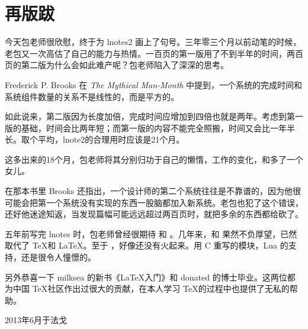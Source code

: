 \chapter{再版跋}

今天包老师很欣慰，终于为 lnotes2 画上了句号。三年零三个月以前动笔的时候，老包又一次高估了自己的能力与热情。一百页的第一版用了不到半年的时间，两百页的第二版为什么会如此难产呢？包老师陷入了深深的思考。

Frederick P. Brooks 在 \emph{The Mythical Man-Month} 中提到，一个系统的完成时间和系统组件数量的关系不是线性的，而是平方的。

如此说来，第二版因为长度加倍，完成时间应增加到四倍也就是两年。考虑到第一版的基础，时间会比两年短；而第一版的内容不能完全照搬，时间又会比一年半长。取个平均，lnote2的合理用时应该是21个月。

这多出来的18个月，包老师将其分别归功于自己的懒惰，工作的变化，和多了一个女儿。

在那本书里 Brooks 还指出，一个设计师的第二个系统往往是不靠谱的，因为他很可能会把第一个系统没有实现的东西一股脑都加入新系统。老包也犯了这个错误，还好他迷途知返，当发现篇幅可能远远超过两百页时，就把多余的东西都给砍了。

五年前写完 lnotes 时，包老师曾经很期待 \XeTeX 和 \LuaTeX。几年来，\XeTeX 和 \XeLaTeX 果然不负厚望，已然取代了 \TeX 和 \LaTeX。至于 \LuaTeX，好像还没有火起来。用 C 重写的模块，Lua 的支持，还是很令人憧憬的。

另外恭喜一下 milksea 的新书《\LaTeX 入门》和 donated 的博士毕业。这两位都为中国 \TeX 社区作出过很大的贡献，在本人学习 \TeX 的过程中也提供了无私的帮助。


\begin{flushright}
  2013年6月于法戈
\end{flushright}

